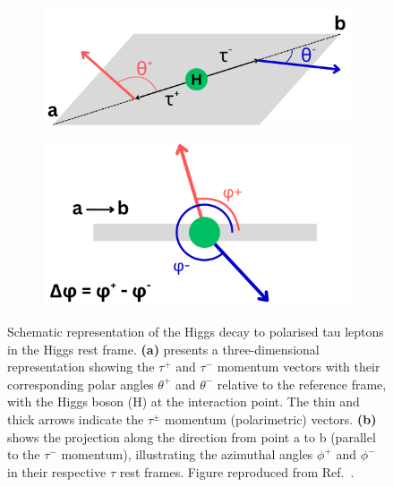 \begin{figure}[h]
    \centering
    \begin{subfigure}{0.45\textwidth}
        \centering
        \includegraphics[width=1\textwidth]{Figures/Chapter2/PolarimetricVector_Definition_1.pdf}
        \caption{}
    \end{subfigure}
    \hfill
    \begin{subfigure}{0.45\textwidth}
        \centering
        \includegraphics[width=1\textwidth]{Figures/Chapter2/PolarimetricVector_Definition_2.pdf}
        \caption{}
    \end{subfigure}
\caption[Schematic representation of the Higgs decay to polarised tau leptons in the
Higgs rest frame]{Schematic representation of the Higgs decay to polarised tau leptons in the
Higgs rest frame. \textbf{(a)} presents a three-dimensional representation showing the $\tau^+$ and $\tau^-$ momentum vectors with their corresponding polar angles $\theta^+$ and $\theta^-$ relative to the reference frame, with the Higgs boson (H) at the interaction point. The thin and thick arrows indicate the $\tau^\pm$ momentum (polarimetric) vectors. \textbf{(b)} shows the projection along the direction from point a to b (parallel to the $\tau^-$ momentum), illustrating the azimuthal angles $\phi^+$ and $\phi^-$ in their respective $\tau$ rest frames. Figure reproduced from Ref.~\cite{PolarimetricVectorDefinition}.}
\label{Figure:Chapter2_PolarimetricVector_Definition}
\end{figure}

